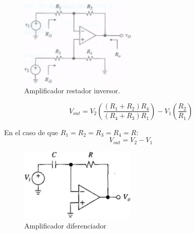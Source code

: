 \documentclass[12pt, letterpaper]{extarticle}
\begin{document}
% 






\begin{figure}[h]
    \centering
    \includegraphics[width=0.5\textwidth]{Media/amplificador_restador_inverso.png}
    \caption{Amplificador restador inversor.}
    \label{Fig: Amplificador restador inversor}
\end{figure}

\begin{equation*}
    V_{out} = V_{2}\left(\frac{(R_{1}+R_{2})R_{4}}{(R_{4}+R_{3})R_{1}}\right)
             -V_{1}\left(\frac{R_{2}}{R_{1}}\right)
\end{equation*}

En el caso de que $R_{1}=R_{2}=R_{3}=R_{4}=R$:
\begin{equation*}
    V_{out} = V_{2} - V_{1}
\end{equation*}


\begin{figure}[h]
    \centering
    \includegraphics[width=0.5\textwidth]{Media/amplificador_diferenciador.png}
    \caption{Amplificador diferenciador}
    \label{Fig: Amplificador diferenciador}
\end{figure}
\end{document}

